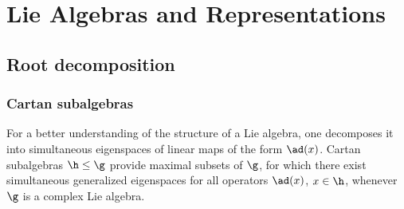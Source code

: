 \chapter{Lie Algebras and Representations}
\section{Root decomposition}
\subsection{Cartan subalgebras}
For a better understanding of the structure of a Lie algebra, one decomposes it into simultaneous eigenspaces of linear maps of the form $\ad(x)$. Cartan subalgebras $\h\leq\g$ provide maximal subsets of $\g$, for which there exist simultaneous generalized eigenspaces for all operators $\ad(x)$, $x\in\h$, whenever $\g$ is a complex Lie algebra.
